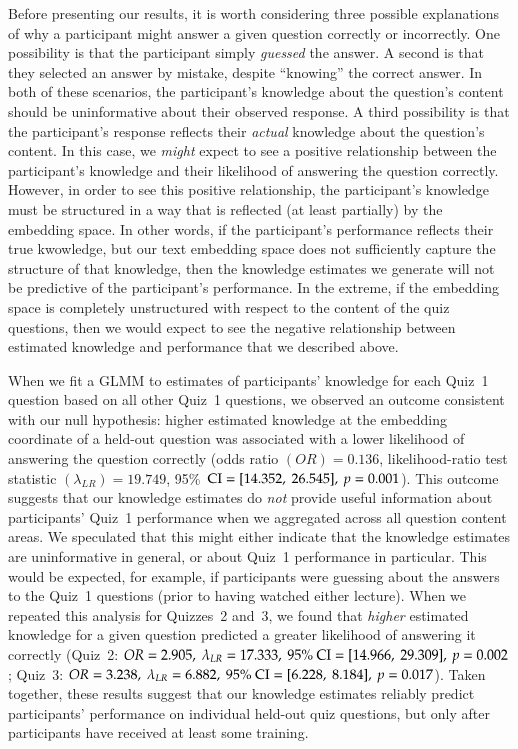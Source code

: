 \documentclass[10pt]{article}
\begin{document}
Before presenting our results, it is worth considering three possible
explanations of why a participant might answer a given question correctly or
incorrectly. One possibility is that the participant simply \textit{guessed}
the answer. A second is that they selected an answer by mistake, despite
``knowing'' the correct answer. In both of these scenarios, the participant's
knowledge about the question's content should be uninformative about their
observed response. A third possibility is that the participant's response
reflects their \textit{actual} knowledge about the question's content. In this
case, we \textit{might} expect to see a positive relationship between the
participant's knowledge and their likelihood of answering the question
correctly. However, in order to see this positive relationship, the
participant's knowledge must be structured in a way that is reflected (at least
partially) by the embedding space. In other words, if the participant's
performance reflects their true kwowledge, but our text embedding space does
not sufficiently capture the structure of that knowledge, then the knowledge
estimates we generate will not be predictive of the participant's performance.
In the extreme, if the embedding space is completely unstructured with respect
to the content of the quiz questions, then we would expect to see the negative
relationship between estimated knowledge and performance that we described
above.

When we fit a GLMM to estimates of participants' knowledge for each Quiz~1
question based on all other Quiz~1 questions, we observed an outcome consistent
with our null hypothesis: higher estimated knowledge at the embedding
coordinate of a held-out question was associated with a lower likelihood of
answering the question correctly (odds ratio $(OR) = 0.136$, likelihood-ratio
test statistic $(\lambda_{LR}) = 19.749$, 95\%\ $\textnormal{CI} = [14.352,\
26.545],\ p = 0.001$). This outcome suggests that our knowledge estimates do
\textit{not} provide useful information about participants' Quiz~1 performance
when we aggregated across all question content areas. We speculated that this
might either indicate that the knowledge estimates are uninformative in
general, or about Quiz~1 performance in particular. This would be expected, for
example, if participants were guessing about the answers to the Quiz~1
questions (prior to having watched either lecture). When we repeated this
analysis for Quizzes~2 and~3, we found that \textit{higher} estimated knowledge
for a given question predicted a greater likelihood of answering it correctly
(Quiz~2: $OR = 2.905,\ \lambda_{LR} = 17.333,\ 95\%\ \textnormal{CI} =
[14.966,\ 29.309],\ p = 0.002$; Quiz~3: $OR = 3.238,\ \lambda_{LR} = 6.882,\
95\%\ \textnormal{CI} = [6.228,\ 8.184],\ p = 0.017$). Taken together, these
results suggest that our knowledge estimates reliably predict participants'
performance on individual held-out quiz questions, but only after participants
have received at least some training.
\end{document}
